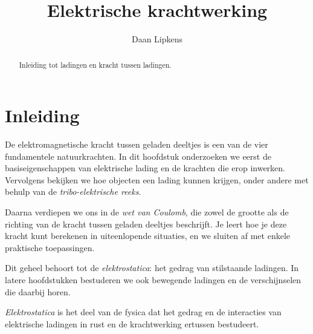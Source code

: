 \documentclass{ximera}
\title{Elektrische krachtwerking}
\author{Daan Lipkens}
\begin{document}
\begin{abstract}
    Inleiding tot ladingen en kracht tussen ladingen.
\end{abstract}

\maketitle\label{hoofdstuk: elektrische_krachtwerking}
\section*{Inleiding}
De elektromagnetische kracht tussen geladen deeltjes is een van de vier fundamentele natuurkrachten. In dit hoofdstuk onderzoeken we eerst de basiseigenschappen van elektrische lading en de krachten die erop inwerken. Vervolgens bekijken we hoe objecten een lading kunnen krijgen, onder andere met behulp van de \emph{tribo-elektrische reeks}.

Daarna verdiepen we ons in de \emph{wet van Coulomb}, die zowel de grootte als de richting van de kracht tussen geladen deeltjes beschrijft. Je leert hoe je deze kracht kunt berekenen in uiteenlopende situaties, en we sluiten af met enkele praktische toepassingen.

Dit geheel behoort tot de \emph{elektrostatica}: het gedrag van stilstaande ladingen. In latere hoofdstukken bestuderen we ook bewegende ladingen en de verschijnselen die daarbij horen.
\begin{definition}
\emph{Elektrostatica} is het deel van de fysica dat het gedrag en de interacties van elektrische ladingen in rust en de krachtwerking ertussen bestudeert.
\end{definition}
\end{document}
